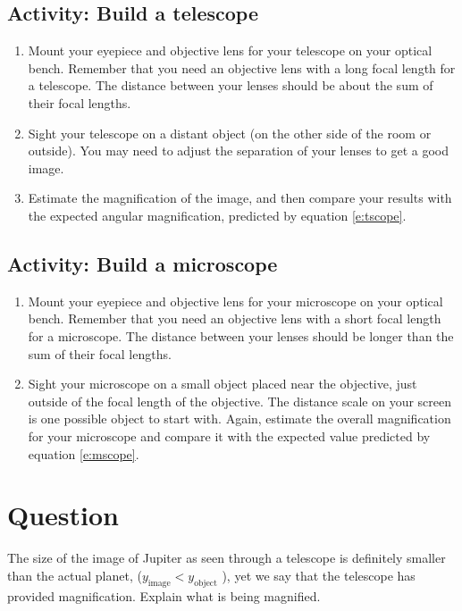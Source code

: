 \subsection{Activity: Build a telescope}
 
\begin{enumerate}
	\item Mount your eyepiece and objective lens for your telescope on your optical bench. Remember that you need an objective lens with a long focal length for a telescope. The distance between your lenses should be about the sum of their focal lengths.
	\item Sight your telescope on a distant object (on the other side of the room or outside). You may need to adjust the separation of your lenses to get a good image. 
	\item Estimate the magnification of the image, and then compare your results with the expected angular magnification, predicted by equation \ref{e:tscope}.
\end{enumerate}

\subsection{Activity: Build a microscope}

\begin{enumerate}
	\item Mount your eyepiece and objective lens for your microscope on your optical bench. Remember that you need an objective lens with a short focal length for a microscope. The distance between your lenses should be longer than the sum of their focal lengths.
	\item Sight your microscope on a small object placed near the objective, just outside of the focal length of the objective. The distance scale on your screen is one possible object to start with. Again, estimate the overall magnification for your microscope and compare it with the expected value predicted by equation \ref{e:mscope}.
\end{enumerate}

\section{Question} 
The size of the image of Jupiter as seen through a telescope is definitely
smaller than the actual planet, ($y_{\textrm{image}} < y_{\textrm{object}}$ ), yet we say that the telescope has provided magnification. Explain what is being magnified.

\endinput